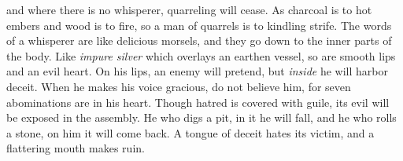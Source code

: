 \begin{biblechapter}
and where there is no whisperer, quarreling will cease.
\verse As charcoal is to hot embers and wood is to fire, 
so a man of quarrels is to kindling strife.
\verse The words of a whisperer are like delicious morsels, 
and they go down to the inner parts of the body.
\verse Like \textit{impure silver} which overlays an earthen vessel, 
so are smooth lips and an evil heart.
\verse On his lips, an enemy will pretend, 
but \textit{inside} he will harbor deceit.
\verse When he makes his voice gracious, do not believe him, 
for seven abominations are in his heart.
\verse Though hatred is covered with guile, 
its evil will be exposed in the assembly.
\verse He who digs a pit, in it he will fall, 
and he who rolls a stone, on him it will come back.
\verse A tongue of deceit hates its victim, 
and a flattering mouth makes ruin.
\end{biblechapter}

